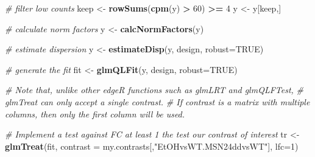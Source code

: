 \documentclass[
]{book}
\newenvironment{Shaded}{\begin{snugshade}}{\end{snugshade}}
\newcommand{\AttributeTok}[1]{\textcolor[rgb]{0.13,0.29,0.53}{#1}}
\newcommand{\CommentTok}[1]{\textcolor[rgb]{0.56,0.35,0.01}{\textit{#1}}}
\newcommand{\ConstantTok}[1]{\textcolor[rgb]{0.56,0.35,0.01}{#1}}
\newcommand{\DecValTok}[1]{\textcolor[rgb]{0.00,0.00,0.81}{#1}}
\newcommand{\FunctionTok}[1]{\textcolor[rgb]{0.13,0.29,0.53}{\textbf{#1}}}
\newcommand{\NormalTok}[1]{#1}
\newcommand{\OtherTok}[1]{\textcolor[rgb]{0.56,0.35,0.01}{#1}}
\newcommand{\SpecialCharTok}[1]{\textcolor[rgb]{0.81,0.36,0.00}{\textbf{#1}}}
\newcommand{\StringTok}[1]{\textcolor[rgb]{0.31,0.60,0.02}{#1}}
\begin{document}
\begin{Shaded}
\begin{Highlighting}[]
\CommentTok{\# filter low counts}
\NormalTok{keep }\OtherTok{\textless{}{-}} \FunctionTok{rowSums}\NormalTok{(}\FunctionTok{cpm}\NormalTok{(y) }\SpecialCharTok{\textgreater{}} \DecValTok{60}\NormalTok{) }\SpecialCharTok{\textgreater{}=} \DecValTok{4}
\NormalTok{y }\OtherTok{\textless{}{-}}\NormalTok{ y[keep,]}

\CommentTok{\# calculate norm factors}
\NormalTok{y }\OtherTok{\textless{}{-}}  \FunctionTok{calcNormFactors}\NormalTok{(y)}

\CommentTok{\# estimate dispersion}
\NormalTok{y }\OtherTok{\textless{}{-}} \FunctionTok{estimateDisp}\NormalTok{(y, design, }\AttributeTok{robust=}\ConstantTok{TRUE}\NormalTok{)}

\CommentTok{\# generate the fit}
\NormalTok{fit }\OtherTok{\textless{}{-}} \FunctionTok{glmQLFit}\NormalTok{(y, design, }\AttributeTok{robust=}\ConstantTok{TRUE}\NormalTok{)}


\CommentTok{\# Note that, unlike other edgeR functions such as glmLRT and glmQLFTest, }
\CommentTok{\# glmTreat can only accept a single contrast. }
\CommentTok{\# If contrast is a matrix with multiple columns, then only the first column will be used.}

\CommentTok{\# Implement a test against FC at least 1 the test our contrast of interest}
\NormalTok{tr }\OtherTok{\textless{}{-}} \FunctionTok{glmTreat}\NormalTok{(fit, }
               \AttributeTok{contrast =}\NormalTok{ my.contrasts[,}\StringTok{"EtOHvsWT.MSN24ddvsWT"}\NormalTok{],}
               \AttributeTok{lfc=}\DecValTok{1}\NormalTok{)}


\end{Highlighting}
\end{Shaded}
\end{document}
